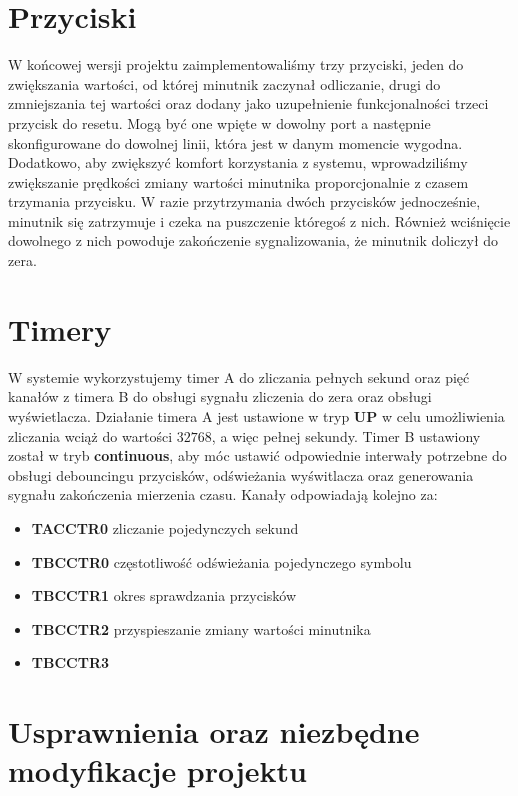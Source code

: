 \documentclass[fleqn]{article}
\begin{document}
\pagebreak

\section{Przyciski}

W końcowej wersji projektu zaimplementowaliśmy trzy przyciski, jeden do zwiększania wartości, od której minutnik zaczynał odliczanie, drugi do zmniejszania tej wartości oraz dodany jako uzupełnienie funkcjonalności trzeci przycisk do resetu. Mogą być one wpięte w dowolny port a następnie skonfigurowane do dowolnej linii, która jest w danym momencie wygodna. Dodatkowo, aby zwiększyć komfort korzystania z systemu, wprowadziliśmy zwiększanie prędkości zmiany wartości minutnika proporcjonalnie z czasem trzymania przycisku. W razie przytrzymania dwóch przycisków jednocześnie, minutnik się zatrzymuje i czeka na puszczenie któregoś z nich. Również wciśnięcie dowolnego z nich powoduje zakończenie sygnalizowania, że minutnik doliczył do zera.


\section{Timery}

W systemie wykorzystujemy timer A do zliczania pełnych sekund oraz pięć kanałów z timera B do obsługi sygnału zliczenia do zera oraz obsługi wyświetlacza. Działanie timera A jest ustawione w tryp \textbf{UP} w celu umożliwienia zliczania wciąż do wartości $32768$, a więc pełnej sekundy. Timer B ustawiony został w tryb \textbf{continuous}, aby móc ustawić odpowiednie interwały potrzebne do obsługi debouncingu przycisków, odświeżania wyświtlacza oraz generowania sygnału zakończenia mierzenia czasu. Kanały odpowiadają kolejno za:
\begin{itemize}
	\item  \textbf{TACCTR0} zliczanie pojedynczych sekund
	\item  \textbf{TBCCTR0} częstotliwość odświeżania pojedynczego symbolu
	\item  \textbf{TBCCTR1} okres sprawdzania przycisków
	\item  \textbf{TBCCTR2} przyspieszanie zmiany wartości minutnika
	\item  \textbf{TBCCTR3}
\end{itemize}

\pagebreak

\section{Usprawnienia oraz niezbędne modyfikacje projektu}
\end{document}
